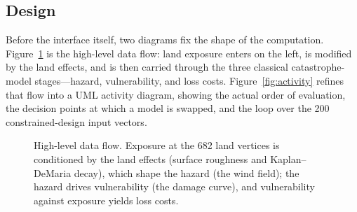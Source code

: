 \documentclass[11pt]{article}
\begin{document}
\subsection{Design}\label{sec:design}
Before the interface itself, two diagrams fix the shape of the computation.
Figure~\ref{fig:dataflow} is the high-level data flow: land exposure enters on the
left, is modified by the land effects, and is then carried through the three
classical catastrophe-model stages---hazard, vulnerability, and loss costs.
Figure~\ref{fig:activity} refines that flow into a UML activity diagram, showing
the actual order of evaluation, the decision points at which a model is swapped,
and the loop over the 200 constrained-design input vectors.

\begin{figure}[H]
\centering
{}
\caption{High-level data flow. Exposure at the 682 land vertices is conditioned by
the land effects (surface roughness and Kaplan--DeMaria decay), which shape the
hazard (the wind field); the hazard drives vulnerability (the damage curve), and
vulnerability against exposure yields loss costs.}
\label{fig:dataflow}
\end{figure}
\end{document}
